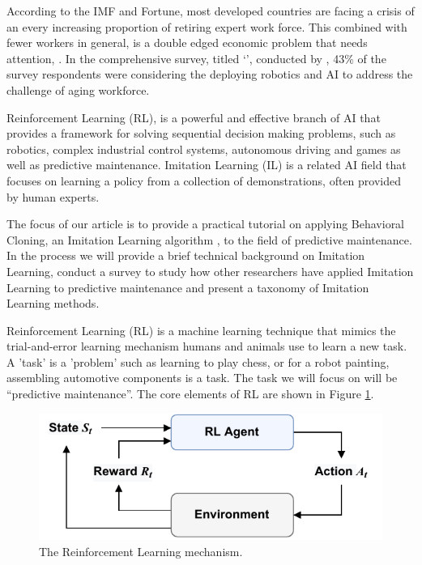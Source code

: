 \documentclass{article}
\begin{document}
According to the IMF and Fortune, most developed countries are facing a crisis of an every increasing proportion of retiring expert work force. This combined with fewer workers in general, is a double edged economic problem that needs attention, \citep{Prakash2024Germanys, Fletcher2024Germanys}. In the comprehensive survey, titled `', conducted by \cite{ManufacturingAging}, 43\% of the survey respondents were considering the deploying robotics and AI to address the challenge of aging workforce.

Reinforcement Learning (RL), is a powerful and effective branch of AI that provides a framework for solving sequential decision making problems, such as robotics, complex industrial control systems, autonomous driving and games as well as predictive maintenance. Imitation Learning (IL) is a related AI field that focuses on learning a policy from a collection of demonstrations, often provided by human experts. 

The focus of our article is to provide a practical tutorial on applying Behavioral Cloning, an Imitation Learning algorithm , to the field of predictive maintenance. In the process we will provide a brief technical background on Imitation Learning, conduct a survey to study how other researchers have applied Imitation Learning to predictive maintenance and present a taxonomy of Imitation Learning methods.  

Reinforcement Learning (RL) is a machine learning technique that mimics the trial-and-error learning mechanism humans and animals use to learn a new task. A 'task' is a 'problem' such as learning to play chess, or for a robot painting, assembling automotive components is a task. The task we will focus on will be ``predictive maintenance''. The core elements of RL are shown in Figure \ref{fig:RL}.
\begin{figure}[h]
	\centering
	\includegraphics[width=0.5\linewidth]{images/RL-loop.pdf}
	\caption{The Reinforcement Learning mechanism.}
	\label{fig:RL}
\end{figure}
\end{document}

